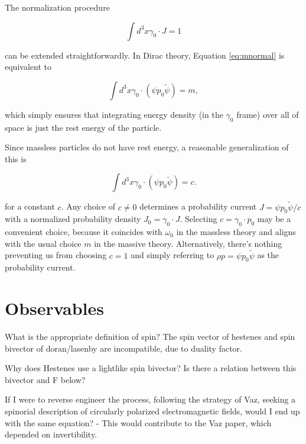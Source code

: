 \documentclass{article}
\begin{document}
  The normalization procedure

  \begin{equation}
    \int d^3x \gamma_0 \cdot J = 1\label{eq:mnormal}
  \end{equation}

  can be extended straightforwardly. In Dirac theory, Equation \ref{eq:mnormal} is equivalent to

  \begin{equation}
    \int d^3x \gamma_0 \cdot (\psi p_0 \widetilde \psi) = m,
  \end{equation}

  which simply ensures that integrating energy density (in the $\gamma_0$ frame) over all of space is just the rest energy of the particle.

  Since massless particles do not have rest energy, a reasonable generalization of this is

  \begin{equation}
    \int d^3x \gamma_0 \cdot (\psi p_0 \widetilde \psi) = c. \label{eq:normalization}
  \end{equation}

  for a constant $c$. Any choice of $c \not= 0$ determines a probability current $J = \psi p_0 \widetilde \psi / c$ with a normalized probability density $J_0 = \gamma_0 \cdot J$. Selecting $c = \gamma_0 \cdot p_0$ may be a convenient choice, because it coincides with $\omega_0$ in the massless theory and aligns with the usual choice $m$ in the massive theory. Alternatively, there's nothing preventing us from choosing $c = 1$ and simply referring to $\rho p = \psi p_0 \widetilde \psi$ as the probability current.

  \section{Observables}

  What is the appropriate definition of spin? The spin vector of hestenes and spin bivector of doran/lasenby are incompatible, due to duality factor. 

  Why does Hestenes use a lightlike spin bivector? Is there a relation between this bivector and F below?

  If I were to reverse engineer the process, following the strategy of Vaz, seeking a spinorial description of circularly polarized electromagnetic fields, would I end up with the same equation?
    - This would contribute to the Vaz paper, which depended on invertibility.
\end{document}
